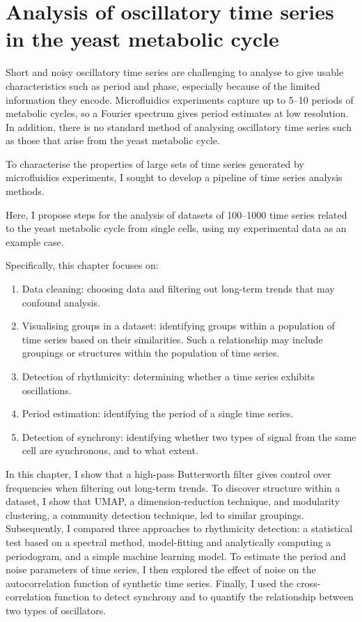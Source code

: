 \chapter{Analysis of oscillatory time series in the yeast metabolic cycle}
\label{ch:analysis}

Short and noisy oscillatory time series are challenging to analyse to give usable characteristics such as period and phase, especially because of the limited information they encode.
Microfluidics experiments capture up to 5--10 periods of metabolic cycles, so a Fourier spectrum gives period estimates at low resolution.
In addition, there is no standard method of analysing oscillatory time series such as those that arise from the yeast metabolic cycle.

To characterise the properties of large sets of time series generated by microfluidics experiments, I sought to develop a pipeline of time series analysis methods.

Here, I propose steps for the analysis of datasets of 100--1000 time series related to the yeast metabolic cycle from single cells, using my experimental data as an example case.

Specifically, this chapter focuses on:
\begin{enumerate}
  \item Data cleaning: choosing data and filtering out long-term trends that may confound analysis.
  \item Visualising groups in a dataset: identifying groups within a population of time series based on their similarities.
        Such a relationship may include groupings or structures within the population of time series.
  \item Detection of rhythmicity: determining whether a time series exhibits oscillations.
  \item Period estimation: identifying the period of a single time series.
  \item Detection of synchrony: identifying whether two types of signal from the same cell are synchronous, and to what extent.
\end{enumerate}

In this chapter, I show that a high-pass Butterworth filter gives control over frequencies when filtering out long-term trends.
To discover structure within a dataset, I show that UMAP, a dimension-reduction technique, and modularity clustering, a community detection technique, led to similar groupings.
Subsequently, I compared three approaches to rhythmicity detection: a statistical test based on a spectral method, model-fitting and analytically computing a periodogram, and a simple machine learning model.
To estimate the period and noise parameters of time series, I then explored the effect of noise on the autocorrelation function of synthetic time series.
Finally, I used the cross-correlation function to detect synchrony and to quantify the relationship between two types of oscillators.


